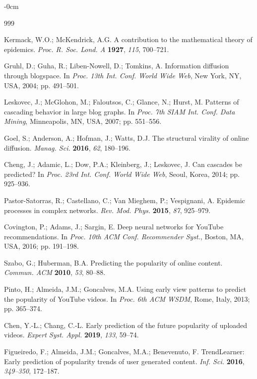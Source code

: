 \documentclass[journal,article,submit,pdftex,moreauthors]{Definitions/mdpi}
\begin{document}
\begin{adjustwidth}{-\extralength}{0cm}
\begin{thebibliography}{999}

Kermack, W.O.; McKendrick, A.G. A contribution to the mathematical theory
of epidemics. {\em Proc. R. Soc. Lond. A} {\bf 1927}, {\em 115}, 700--721.

Gruhl, D.; Guha, R.; Liben-Nowell, D.; Tomkins, A. Information diffusion
through blogspace. In {\em Proc. 13th Int. Conf. World Wide Web},
New York, NY, USA, 2004; pp. 491--501.

Leskovec, J.; McGlohon, M.; Faloutsos, C.; Glance, N.; Hurst, M. Patterns
of cascading behavior in large blog graphs. In {\em Proc. 7th SIAM Int.
Conf. Data Mining}, Minneapolis, MN, USA, 2007; pp. 551--556.

Goel, S.; Anderson, A.; Hofman, J.; Watts, D.J. The structural virality of
online diffusion. {\em Manag. Sci.} {\bf 2016}, {\em 62}, 180--196.

Cheng, J.; Adamic, L.; Dow, P.A.; Kleinberg, J.; Leskovec, J. Can cascades
be predicted? In {\em Proc. 23rd Int. Conf. World Wide Web},
Seoul, Korea, 2014; pp. 925--936.

Pastor-Satorras, R.; Castellano, C.; Van Mieghem, P.; Vespignani, A.
Epidemic processes in complex networks.
{\em Rev. Mod. Phys.} {\bf 2015}, {\em 87}, 925--979.

Covington, P.; Adams, J.; Sargin, E. Deep neural networks for YouTube
recommendations. In {\em Proc. 10th ACM Conf. Recommender Syst.},
Boston, MA, USA, 2016; pp. 191--198.

Szabo, G.; Huberman, B.A. Predicting the popularity of online content.
{\em Commun. ACM} {\bf 2010}, {\em 53}, 80--88.

Pinto, H.; Almeida, J.M.; Goncalves, M.A. Using early view patterns to
predict the popularity of YouTube videos. In {\em Proc. 6th ACM WSDM},
Rome, Italy, 2013; pp. 365--374.

Chen, Y.-L.; Chang, C.-L. Early prediction of the future popularity of
uploaded videos. {\em Expert Syst. Appl.} {\bf 2019}, {\em 133}, 59--74.

Figueiredo, F.; Almeida, J.M.; Goncalves, M.A.; Benevenuto, F.
TrendLearner: Early prediction of popularity trends of user generated
content. {\em Inf. Sci.} {\bf 2016}, {\em 349--350}, 172--187.


\end{thebibliography}
\end{adjustwidth}
\end{document}
